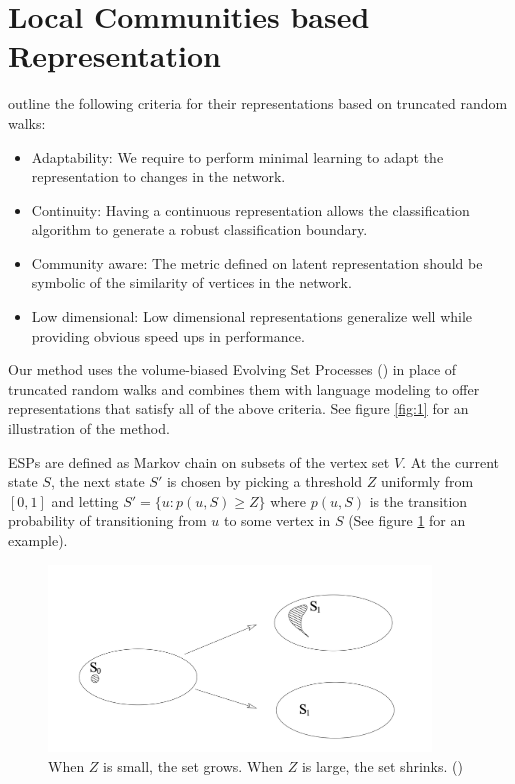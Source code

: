 \documentclass{article}
\begin{document}
\section{Local Communities based Representation}
\citet{Perozzi_2014} outline the following criteria for their representations based on truncated random walks:
\begin{itemize}
  \item Adaptability: We require to perform minimal learning to adapt the representation to changes in the network.
  \item Continuity: Having a continuous representation allows the classification algorithm to generate a robust classification boundary.
  \item Community aware: The metric defined on latent representation should be symbolic of the similarity of vertices in the network.
  \item Low dimensional: Low dimensional representations generalize well while providing obvious speed ups in performance.
\end{itemize}
Our method uses the volume-biased Evolving Set Processes (\citet{Shayan}) in place of truncated random walks and combines them with language modeling to offer
representations that satisfy all of the above criteria. See figure \ref{fig:1} for an illustration of the method.

ESPs are defined as Markov chain on subsets of the vertex set \(V\). At the current state \(S\), the next state \(S'\)
 is chosen by picking a threshold \(Z\) uniformly from \([0,1]\) and letting \(S'=\{u:p(u, S)\geq Z\}\) where \(p(u,S)\) is the transition
 probability of transitioning from \(u\) to some vertex in \(S\) (See figure \ref{fig:2} for an example).
 \begin{figure}
 \begin{center}
  \includegraphics[width=4in]{ESP.png}
  \caption{When \(Z\) is small, the set grows. When \(Z\) is large, the set shrinks. (\cite{ESP})}
  \label{fig:2}
\end{center}
\end{figure}
 
\end{document}
